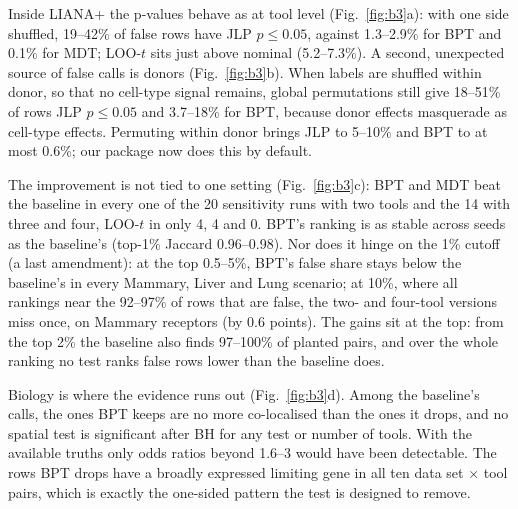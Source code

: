 \documentclass[11pt]{article}
\newcommand{\JLP}{JLP}
\newcommand{\BPT}{BPT}
\newcommand{\MDT}{MDT}
\newcommand{\LOO}{LOO-$t$}
\begin{document}
Inside LIANA+ the p-values behave as at tool level (Fig.~\ref{fig:b3}a): with one side shuffled, 19--42\% of false
rows have \JLP{} $p\le0.05$, against 1.3--2.9\% for \BPT{} and 0.1\% for \MDT; \LOO{} sits just above nominal
(5.2--7.3\%). A second, unexpected source of false calls is donors (Fig.~\ref{fig:b3}b). When labels are shuffled
within donor, so that no cell-type signal remains, global permutations still give 18--51\% of rows \JLP{} $p\le0.05$
and 3.7--18\% for \BPT, because donor effects masquerade as cell-type effects. Permuting within donor brings \JLP{} to
5--10\% and \BPT{} to at most 0.6\%; our package now does this by default.

The improvement is not tied to one setting (Fig.~\ref{fig:b3}c): \BPT{} and \MDT{} beat the baseline in every one of
the 20 sensitivity runs with two tools and the 14 with three and four, \LOO{} in only 4, 4 and 0. \BPT's ranking is
as stable across seeds as the baseline's (top-1\% Jaccard 0.96--0.98). Nor does it hinge on the 1\% cutoff (a
last amendment): at the top 0.5--5\%, \BPT's false share stays below the baseline's in every Mammary, Liver and
Lung scenario; at 10\%, where all rankings near the 92--97\% of rows that are false, the two- and four-tool versions
miss once, on Mammary receptors (by 0.6 points). The gains sit at the top: from the top 2\% the baseline also finds
97--100\% of planted pairs, and over the whole ranking no test ranks false rows lower than the baseline does.

Biology is where the evidence runs out (Fig.~\ref{fig:b3}d). Among the baseline's calls, the ones \BPT{} keeps are no
more co-localised than the ones it drops, and no spatial test is significant after BH for any test or number of
tools. With the available truths only odds ratios beyond 1.6--3 would have been detectable. The rows \BPT{} drops have a
broadly expressed limiting gene in all ten data set $\times$ tool pairs, which is exactly the one-sided pattern the test
is designed to remove.
\end{document}
